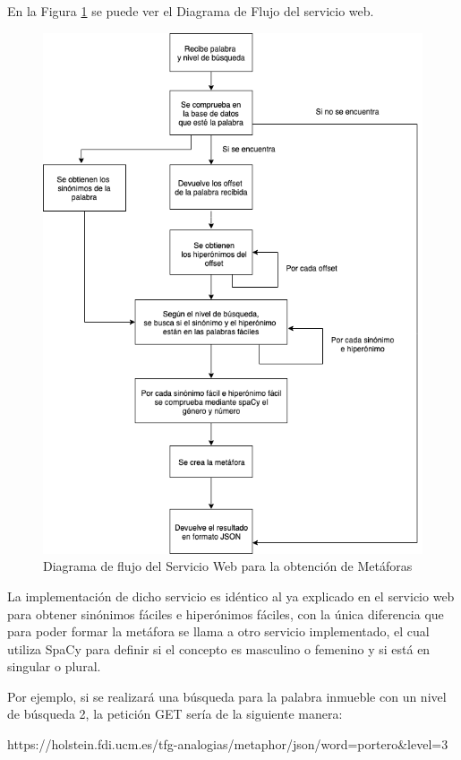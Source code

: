 En la Figura \ref{fig:swmetafora} se puede ver el Diagrama de Flujo del servicio web.
\begin{figure}[!h]
	\includegraphics[width=.9\textwidth]{Imagenes/Bitmap/Capitulo4/ServiciosWeb/DiagramaFlujoMetafora.png}
	\centering
	\caption{Diagrama de flujo del Servicio Web para la obtención de Metáforas}
	\label{fig:swmetafora}
\end{figure}

La implementación de dicho servicio es idéntico al ya explicado en el servicio web para obtener sinónimos fáciles e hiperónimos fáciles, con la única diferencia que para poder formar la metáfora se llama a otro servicio implementado, el cual utiliza SpaCy para definir si el concepto es masculino o femenino y si está en singular o plural.

Por ejemplo, si se realizará una búsqueda para la palabra inmueble con un nivel de búsqueda 2, la petición GET sería de la siguiente manera:

https://holstein.fdi.ucm.es/tfg-analogias/metaphor/json/word=portero\&level=3

